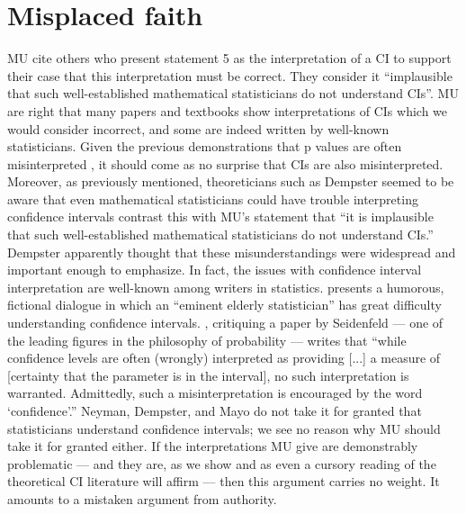 \documentclass[jou,a4paper,floatsintext,draftfirst]{apa6}\usepackage[]{graphicx}\usepackage[]{color}
\begin{document}
\section{Misplaced faith}

MU cite others who present statement 5 as the interpretation of a CI to support their case that this interpretation must be correct. They consider it ``implausible that such well-established mathematical statisticians do not understand CIs''. MU are right that many papers and textbooks show interpretations of CIs which we would consider incorrect, and some are indeed written by well-known statisticians. Given the previous demonstrations that p values are often misinterpreted \citep[e.g.,][]{Haller:Krauss:2002}, it should come as no surprise that CIs are also misinterpreted. Moreover, as previously mentioned, theoreticians such as Dempster seemed to be aware that even mathematical statisticians could have trouble interpreting confidence intervals contrast this with MU's statement that ``it is implausible that such well-established mathematical statisticians do not understand CIs.'' Dempster apparently thought that these misunderstandings were widespread and important enough to emphasize. In fact, the issues with confidence interval interpretation are well-known among writers in statistics. \citet[][pp. 211-215]{Neyman:1952} presents a humorous, fictional dialogue in which an ``eminent elderly statistician'' has great difficulty understanding confidence intervals. \citet{Mayo:1981}, critiquing a paper by Seidenfeld --- one of the leading figures in the philosophy of probability --- writes that ``while confidence levels are often (wrongly) interpreted as providing [...] a measure of [certainty that the parameter is in the interval], no such interpretation is warranted. Admittedly, such a misinterpretation is encouraged by the word `confidence'.'' Neyman, Dempster, and Mayo do not take it for granted that statisticians understand confidence intervals; we see no reason why MU should take it for granted either. If the interpretations MU give are demonstrably problematic --- and they are, as we show and as even a cursory reading of the theoretical CI literature will affirm --- then this argument carries no weight. It amounts to a mistaken argument from authority.
\end{document}
